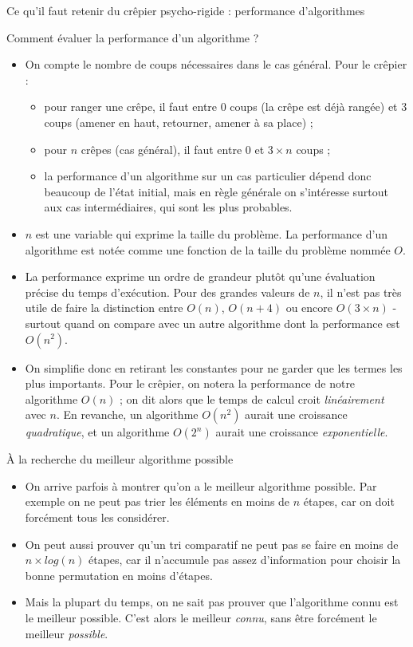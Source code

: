 \begin{frame}{Ce qu'il faut retenir du crêpier psycho-rigide : performance d'algorithmes}
\begin{block}{Comment évaluer la performance d'un algorithme ?}
    \begin{itemize}
      \item On compte le nombre de coups nécessaires dans le cas général. Pour le crêpier :
        \begin{itemize}
          \item pour ranger une crêpe, il faut entre $0$ coups (la crêpe est déjà rangée) et $3$ coups (amener en haut, retourner, amener à sa place) ;
          \item pour $n$ crêpes (cas général), il faut entre $0$ et $3 \times n$ coups ;
          \item la performance d'un algorithme sur un cas particulier dépend donc beaucoup de l'état initial, mais en règle générale on s'intéresse surtout aux cas intermédiaires, qui sont les plus probables.
        \end{itemize}
      \item $n$ est une variable qui exprime la taille du problème. La performance d'un algorithme est notée comme une fonction de la taille du problème nommée $O$.
      \item La performance exprime un ordre de grandeur plutôt qu'une évaluation précise du temps d'exécution. Pour des grandes valeurs de $n$, il n'est pas très utile de faire la distinction entre $O(n)$, $O(n+4)$ ou encore $O(3 \times n)$ - surtout quand on compare avec un autre algorithme dont la performance est $O(n^2)$. 
      \item On simplifie donc en retirant les constantes pour ne garder que les termes les plus importants. Pour le crêpier, on notera la performance de notre algorithme $O(n)$ ; on dit alors que le temps de calcul croit \textit{linéairement} avec $n$. En revanche, un algorithme $O(n^2)$ aurait une croissance \textit{quadratique}, et un algorithme $O(2^n)$ aurait une croissance \textit{exponentielle}.
     \end{itemize}
  \end{block}

  \begin{block}{À la recherche du meilleur algorithme possible}
    \begin{itemize}
    \item On arrive parfois à montrer qu'on a le meilleur algorithme possible. Par exemple on ne peut pas trier les éléments en moins de $n$ étapes, car on doit forcément tous les considérer.
    \item On peut aussi prouver qu'un tri comparatif ne peut pas se faire en moins de $n\times log(n)$ étapes, car il n'accumule pas assez d'information pour choisir la bonne permutation en moins d'étapes.
    \item Mais la plupart du temps, on ne sait pas prouver que l'algorithme connu est le meilleur possible. C'est alors le meilleur \textit{connu}, sans être forcément le meilleur \textit{possible}.
    \end{itemize}
  \end{block}


\end{frame}

